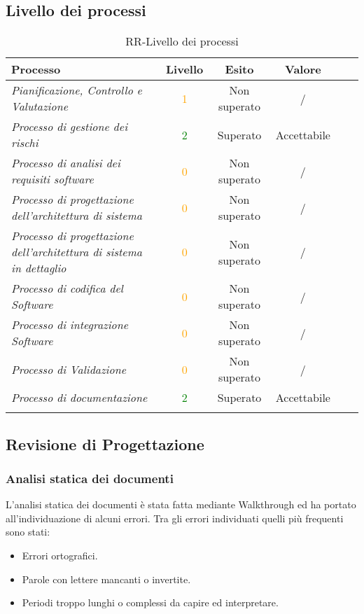 \newpage

\subsection{Livello dei processi}
\begin{longtable}{|>{\centering}m{5cm}|c|c|c|c|c|}
\hline
\textbf{Processo} & \textbf{Livello} & \textbf{Esito} & \textbf{Valore}\\
\hline
\endhead
\emph{Pianificazione, Controllo e Valutazione} & \textcolor{Orange}{1} & Non superato & /\\ \hline
\emph{Processo di gestione dei rischi} & \textcolor{Green}{2} & Superato & Accettabile\\ \hline
\emph{Processo di analisi dei requisiti software} & \textcolor{Orange}{0} & Non superato & /\\ \hline
\emph{Processo di progettazione dell’architettura di sistema} & \textcolor{Orange}{0} & Non superato & /\\ \hline
\emph{Processo di progettazione dell’architettura di sistema in dettaglio} & \textcolor{Orange}{0} & Non superato & /\\ \hline
\emph{Processo di codifica del Software} & \textcolor{Orange}{0} & Non superato & /\\ \hline
\emph{Processo di integrazione Software} & \textcolor{Orange}{0} & Non superato & /\\ \hline
\emph{Processo di Validazione} & \textcolor{Orange}{0} & Non superato & /\\ 
\hline
\emph{Processo di documentazione} & \textcolor{Green}{2} & Superato & Accettabile\\ 
\hline
\caption{RR-Livello dei processi}
\end{longtable}

\newpage

\subsection{Revisione di Progettazione}

\subsubsection{Analisi statica dei documenti}
L'analisi statica dei documenti è stata fatta mediante Walkthrough ed ha portato all'individuazione di alcuni errori. Tra gli errori individuati quelli più frequenti sono stati:
		\begin{itemize}
			\item Errori ortografici.
			\item Parole con lettere mancanti o invertite.
			\item Periodi troppo lunghi o complessi da capire ed interpretare.
		\end{itemize}

